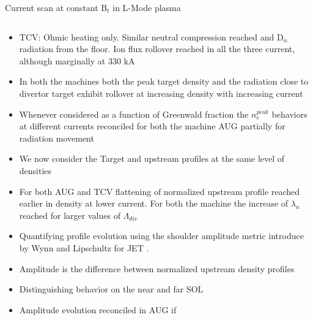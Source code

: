 \documentclass[10pt, compress]{beamer}
\begin{document}
\begin{frame}{Current scan at constant B$_t$ in L-Mode plasma}
\begin{columns}
\begin{column}{0.3\textwidth}
\begin{itemize}
          avoid earlier disruption. Comparable neutral pressure in the
          subdivertor region reached. 0.5 MW NBI additional power added to
          keep power in the SOL approximately constant
        \item<3|only@3> TCV: Ohmic heating only. Similar neutral compression reached and
          D$_{\alpha}$ radiation from the floor. Ion flux rollover
          reached in all the three current,  although marginally at
          330 kA
        \item<4|only@4> In both the machines both the peak target
          density and the radiation close to divertor target exhibit
          rollover at increasing density with increasing current
        \item<5|only@5> Whenever considered as a function of
          Greenwald fraction the $n_e^{peak}$ behaviors at different currents
          reconciled for both the machine AUG \alert{partially for
            radiation movement}
        \item<only@6-7> We now consider the Target and upstream
          profiles at the same level of densities  
        \item<only@7> For both AUG and TCV flattening of normalized
          upstream profile reached \alert{earlier in density at lower
            current.} For both the machine the increase of $\lambda_n$
          reached for larger values of $\Lambda_{div}$
        \item<only@8> Quantifying profile evolution using the
          \alert{shoulder amplitude metric} introduce by Wynn and
          Lipschultz for JET \parencite{Wynn:2018gp}.
        \item<only@8>  \alert{Amplitude is the difference
            between normalized upstream density profiles}
        \item<only@8> Distinguishing behavior on the near and far SOL  
        \item<only@11> Amplitude evolution reconciled in AUG if

\end{itemize}
\end{column}
\end{columns}
\end{frame}
\end{document}
